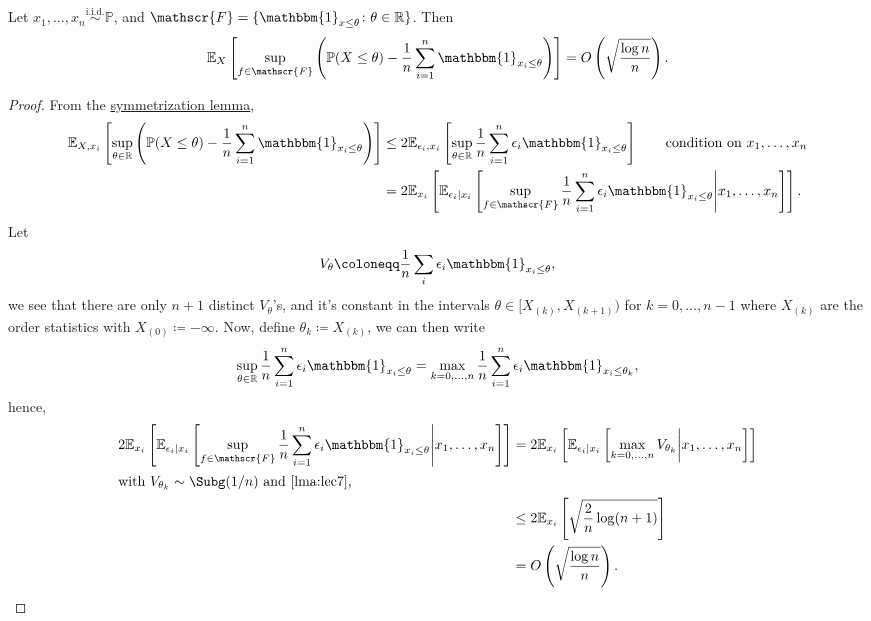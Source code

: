 \begin{proposition}\label{prop:symmetrization}
	Let \(x_1, \dots , x_n \overset{\text{i.i.d.} }{\sim } \mathbb{P} \), and \(\mathscr{F} = \{ \mathbbm{1}_{x \leq \theta} \colon \theta \in \mathbb{R} \} \). Then
	\[
		\mathbb{E}_{X}\left[ \sup _{f\in \mathscr{F} } \left( \mathbb{P} (X \leq \theta ) - \frac{1}{n}\sum_{i=1}^{n} \mathbbm{1}_{x_i \leq \theta } \right) \right] = O\left( \sqrt{\frac{\log n}{n}}  \right).
	\]
\end{proposition}
\begin{proof}
	From the \hyperref[lma:symmetrization]{symmetrization lemma},
	\begin{align*}
		\mathbb{E}_{X, x_i}\left[\sup _{\theta \in \mathbb{R} } \left( \mathbb{P} (X \leq \theta ) - \frac{1}{n} \sum_{i=1}^{n} \mathbbm{1}_{x_i \leq \theta } \right) \right]
		 & \leq 2 \mathbb{E}_{\epsilon _i, x_i}\left[\sup _{\theta \in \mathbb{R} } \frac{1}{n}\sum_{i=1}^{n} \epsilon _i \mathbbm{1}_{x_i \leq \theta } \right]\tag*{condition on \(x_1, \dots , x_n\)}                   \\
		 & = 2 \mathbb{E}_{x_i}\left[ \mathbb{E}_{\epsilon _i \mid x_i}\left[ \sup _{f\in \mathscr{F} } \frac{1}{n} \sum_{i=1}^{n} \epsilon _i \mathbbm{1}_{x_i \leq \theta } \middle| x_1, \dots , x_n \right]  \right] .
	\end{align*}
	Let
	\[
		V_\theta \coloneqq \frac{1}{n}\sum_{i} \epsilon _i \mathbbm{1}_{x_i \leq \theta } ,
	\]
	we see that there are only \(n+1\) distinct \(V_\theta \)'s, and it's constant in the intervals \(\theta \in [X_{(k)}, X_{(k+1)})\) for \(k = 0, \dots , n-1\) where \(X_{(k)}\) are the order statistics with \(X_{(0)} \coloneqq -\infty \). Now, define \(\theta _k \coloneqq X_{(k)}\), we can then write
	\[
		\sup _{\theta \in \mathbb{R} }\frac{1}{n} \sum_{i=1}^{n} \epsilon _i \mathbbm{1}_{x_i \leq \theta }
		= \max _{k=0, \dots , n} \frac{1}{n}\sum_{i=1}^{n} \epsilon _i \mathbbm{1}_{x_i \leq \theta _k},
	\]
	hence,
	\begin{align*}
		2 \mathbb{E}_{x_i}\left[ \mathbb{E}_{\epsilon _i \mid x_i}\left[ \sup _{f\in \mathscr{F} } \frac{1}{n} \sum_{i=1}^{n} \epsilon _i \mathbbm{1}_{x_i \leq \theta } \middle| x_1, \dots , x_n \right]  \right]
		 & = 2 \mathbb{E}_{x_i}\left[ \mathbb{E}_{\epsilon _i \mid x_i}\left[ \max _{k=0, \dots , n} V_{\theta _k} \middle| x_1, \dots , x_n \right]  \right] \\
		\shortintertext{with \(V_{\theta _k} \sim \Subg(1 / n) \) and \autoref{lma:lec7},}
		 & \leq 2 \mathbb{E}_{x_i}\left[ \sqrt{\frac{2}{n} \log (n+1)} \right]                                                                                \\
		 & = O\left( \sqrt{\frac{\log n	}{n}} \right).
	\end{align*}
\end{proof}

